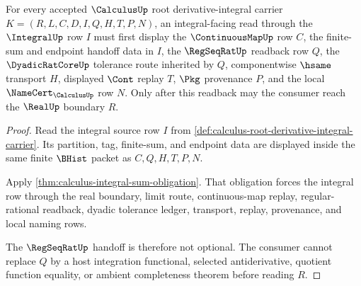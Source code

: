 \begin{theorem}
\label{thm:calculus-root-integral-regseqrat-handoff}
For every accepted $\CalculusUp$ root derivative-integral carrier $K=(R,L,C,D,I,Q,H,T,P,N)$, an integral-facing read through the $\IntegralUp$ row $I$ must first display the $\ContinuousMapUp$ row $C$, the finite-sum and endpoint handoff data in $I$, the $\RegSeqRatUp$ readback row $Q$, the $\DyadicRatCoreUp$ tolerance route inherited by $Q$, componentwise $\hsame$ transport $H$, displayed $\Cont$ replay $T$, $\Pkg$ provenance $P$, and the local $\NameCert_{\CalculusUp}$ row $N$. Only after this readback may the consumer reach the $\RealUp$ boundary $R$.
\end{theorem}
\begin{proof}
Read the integral source row $I$ from \autoref{def:calculus-root-derivative-integral-carrier}. Its partition, tag, finite-sum, and endpoint data are displayed inside the same finite $\BHist$ packet as $C,Q,H,T,P,N$.

Apply \autoref{thm:calculus-integral-sum-obligation}. That obligation forces the integral row through the real boundary, limit route, continuous-map replay, regular-rational readback, dyadic tolerance ledger, transport, replay, provenance, and local naming rows.

The $\RegSeqRatUp$ handoff is therefore not optional. The consumer cannot replace $Q$ by a host integration functional, selected antiderivative, quotient function equality, or ambient completeness theorem before reading $R$.
\end{proof}

